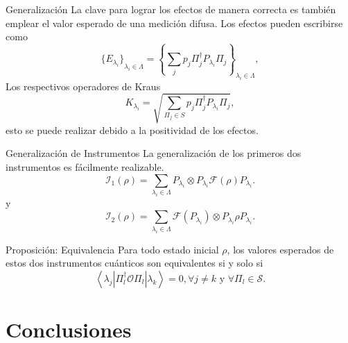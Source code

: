 \documentclass[svgnames,12pt,aspectratio=149]{beamer}
\newcommand{\tensor}{\otimes}
\newcommand{\fuzzy}[1]{\mathcal{F}\left(#1\right)}
\newcommand{\permutdagger}[2]{\Pi_{#1}^{\dagger}#2\Pi_{#1}}
\begin{document}
\begin{frame}{Generalización}
  La clave para lograr los efectos de manera correcta es también emplear el valor esperado de una medición difusa. Los efectos pueden escribirse como
  \begin{equation*}
      {\{E_{\lambda_i}\}}_{\lambda_i \in \Lambda}={\left\{\sum_{j} p_{j} \permutdagger{j}{P_{\lambda_i}}\right\}}_{\lambda_i \in \Lambda},
  \end{equation*}  
  Los respectivos operadores de Kraus 
  \begin{equation*}
     K_{\lambda_i}=\sqrt{\sum_{\Pi_j \in S} p_j \permutdagger{j}{P_{\lambda_i} }},
  \end{equation*} 
  esto se puede realizar debido a la positividad de los efectos.
\end{frame}


\begin{frame}{Generalización de Instrumentos}
  La generalización de los primeros dos instrumentos es fácilmente realizable.
\begin{equation*}
    \mathcal{I}_1(\rho)=\sum_{\lambda_i \in \Lambda }P_{\lambda_i}\otimes P_{\lambda_i}\fuzzy{\rho}P_{\lambda_i}.
\end{equation*} 
y
\begin{equation*}
  \mathcal{I}_2(\rho)= \sum_{\lambda_i \in \Lambda } \fuzzy{P_{\lambda_i}}\tensor P_{\lambda_i}\rho P_{\lambda_i}.
\end{equation*} 

\begin{block}{Proposición: Equivalencia}
  Para todo estado inicial $\rho$, los valores esperados de estos dos instrumentos
cuánticos son equivalentes si y solo si \[\left \langle \lambda_j \left|\Pi_l^\dagger
\mathcal{O} \Pi_l\right|\lambda_k\right\rangle=0,\forall j\ne k \text{ y }
\forall \Pi_l \in \mathcal{S}.\]
\end{block} 




\end{frame}




\section{Conclusiones}
\end{document}
